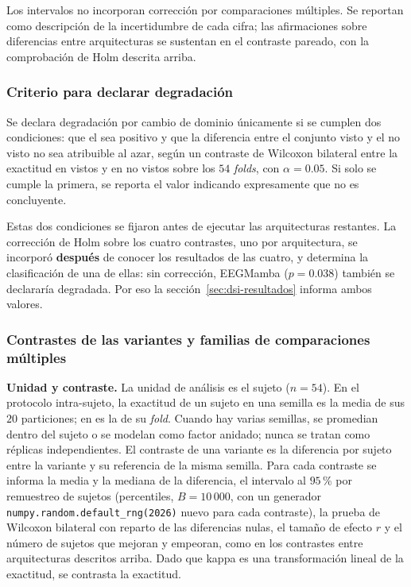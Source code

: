 Los intervalos no incorporan corrección por comparaciones múltiples. Se reportan como
descripción de la incertidumbre de cada cifra; las afirmaciones sobre diferencias entre
arquitecturas se sustentan en el contraste pareado, con la comprobación de Holm descrita
arriba.

\subsubsection{Criterio para declarar degradación}

Se declara degradación por cambio de dominio únicamente si se cumplen dos
condiciones: que el \dsi{} sea positivo y que la diferencia entre el conjunto
visto y el no visto no sea atribuible al azar, según un contraste de Wilcoxon bilateral
entre la exactitud en vistos y en no vistos sobre los $54$ \textit{folds}, con
$\alpha = 0.05$. Si solo se cumple la primera, se
reporta el valor indicando expresamente que no es concluyente.

Estas dos condiciones se fijaron antes de ejecutar las arquitecturas restantes. La
corrección de Holm sobre los cuatro contrastes, uno por arquitectura, se incorporó
\textbf{después} de conocer los resultados de las cuatro, y determina la clasificación de una
de ellas: sin corrección, EEGMamba ($p = 0.038$) también se declararía degradada. Por eso
la sección~\ref{sec:dsi-resultados} informa ambos valores.

\subsubsection{Contrastes de las variantes y familias de comparaciones múltiples}
\label{sec:estadistica-variantes}

\textbf{Unidad y contraste.} La unidad de análisis es el sujeto ($n = 54$). En el protocolo
intra-sujeto, la exactitud de un sujeto en una semilla es la media de sus $20$ particiones;
en \loso{} es la de su \textit{fold}. Cuando hay varias semillas, se promedian dentro del sujeto o
se modelan como factor anidado; nunca se tratan como réplicas independientes. El contraste
de una variante es la diferencia por sujeto entre la variante y su referencia de la misma
semilla. Para cada contraste se informa la media y la mediana de la diferencia, el
intervalo al $95$\,\% por remuestreo de sujetos (percentiles, $B = 10\,000$, con un
generador \texttt{numpy.random.default\_rng(2026)} nuevo para cada contraste), la prueba de
Wilcoxon bilateral con reparto de las diferencias nulas, el tamaño de efecto $r$ y el número
de sujetos que mejoran y empeoran, como en los contrastes entre arquitecturas descritos arriba. Dado que kappa
es una transformación lineal de la exactitud, se contrasta la exactitud.

